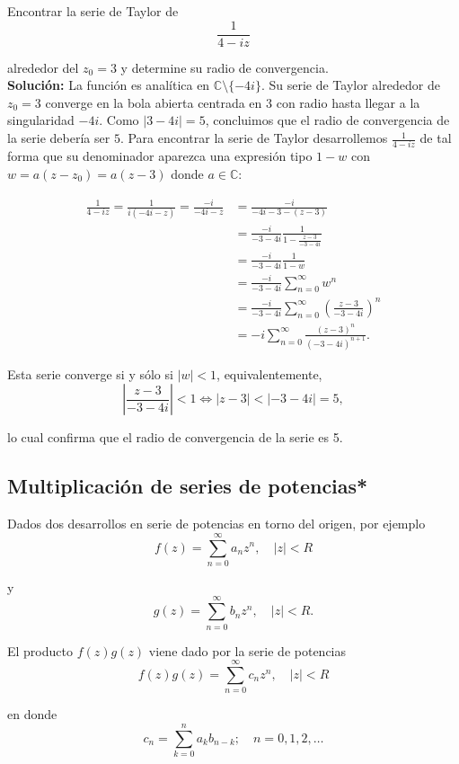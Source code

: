 \begin{ejemplo}
Encontrar la serie de Taylor de 
$$\frac{1}{4-iz}$$

alrededor del $z_0 = 3$ y determine su radio de convergencia.
\\

\textbf{Solución:} La función es analítica en $\mathbb{C} \setminus \{-4i\}$. Su serie de Taylor alrededor de $z_0 = 3$ converge en la bola abierta centrada en $3$ con radio hasta llegar a la singularidad $-4i$. Como $|3-4i| = 5$, concluimos que el radio de convergencia de la serie debería ser $5$. Para encontrar la serie de Taylor desarrollemos  $\frac{1}{4-iz}$ de tal forma que su denominador aparezca una expresión tipo $1-w$ con $w = a(z-z_0) = a(z-3)$ donde $a \in \mathbb{C}$:

\begin{align*}
    \frac{1}{4-iz} = \frac{1}{i(-4i-z)} = \frac{-i}{-4i -z} 
    &= \frac{-i}{-4i-3-(z-3)} \\
    &= \frac{-i}{-3-4i} \frac{1}{1 - \frac{z-3}{-3-4i}} \\
    &=  \frac{-i}{-3-4i} \frac{1}{1 - w} \\
    &= \frac{-i}{-3-4i} \sum_{n=0}^{\infty} w^n \\
    &= \frac{-i}{-3-4i} \sum_{n=0}^{\infty} \left(\frac{z-3}{-3-4i} \right)^n \\
    &= -i \sum_{n=0}^{\infty} \frac{(z-3)^n}{(-3-4i)^{n+1}}.
\end{align*}

Esta serie converge si y sólo si $|w| < 1$, equivalentemente,
$$\left|\frac{z-3}{-3-4i} \right| < 1 \Leftrightarrow |z-3| < |-3-4i| = 5,$$

lo cual confirma que el radio de convergencia de la serie es 5.
\end{ejemplo}

\subsection*{Multiplicación de series de potencias*}

\begin{teorema}
Dados dos desarrollos en serie de potencias en torno del origen, por ejemplo
$$f(z) = \sum_{n=0}^{\infty} a_n z^n, \quad |z| < R$$

y
$$g(z) = \sum_{n=0}^{\infty} b_n z^n, \quad |z| < R.$$

El producto $f(z) g(z)$ viene dado por la serie de potencias
$$f(z) g(z) = \sum_{n=0}^{\infty} c_n z^n, \quad |z| < R$$

en donde 
$$c_n = \sum_{k=0}^n a_k b_{n-k}; \quad n = 0,1,2, \dots$$
\end{teorema}

